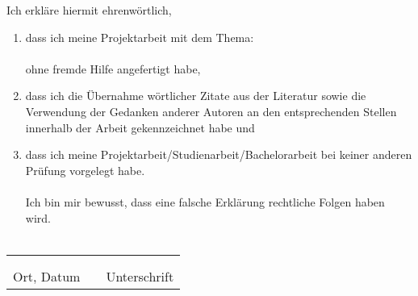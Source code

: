 Ich erkläre hiermit ehrenwörtlich,
\begin{enumerate}[leftmargin=0.5cm]
	\item 	dass ich meine Projektarbeit mit dem Thema:  \\
			\textbf{\CTITLE} \\
			ohne fremde Hilfe angefertigt habe, \\
	\item	dass ich die Übernahme wörtlicher Zitate aus der Literatur sowie die Verwendung der
			Gedanken anderer Autoren an den entsprechenden Stellen innerhalb der Arbeit gekennzeichnet habe und  \\
	\item	dass ich meine Projektarbeit/Studienarbeit/Bachelorarbeit bei keiner anderen Prüfung vorgelegt habe. \\\\
			Ich bin mir bewusst, dass eine falsche Erklärung rechtliche Folgen haben wird. \\\\
\end{enumerate}
\vspace*{\fill}
\begin{tabular} {lrl}
	\hspace{6cm} & \hspace{3cm} & \hspace{6cm} \\
	\hrulefill & & \hrulefill \\
	Ort, Datum & & Unterschrift
\end{tabular}
\vspace*{\fill}
